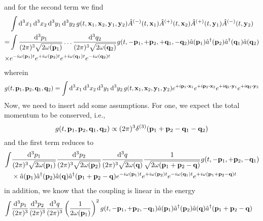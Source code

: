 and for the second term we find
\begin{equation}
	\begin{split}
		&
		\int\dd[3]{x_1}\dd[3]{x_2}\dd[3]{y_1}\dd[3]{y_2}
		g(t,\vb{x}_1,\vb{x}_2,\vb{y}_1,\vb{y}_2)
		\hat{A}^{(-)}(t,\vb{x}_1)
		\hat{A}^{(+)}(t,\vb{x}_2)
		\hat{A}^{(+)}(t,\vb{y}_1)
		\hat{A}^{(-)}(t,\vb{y}_2)
		\\
		=&
		\int
		\frac{\dd[3]{p_1}}{(2\pi)^3\sqrt{2\omega(\vb{p}_1)}}
		\dots
		\frac{\dd[3]{q_2}}{(2\pi)^3\sqrt{2\omega(\vb{q}_2)}}
		g(t,-\vb{p}_1,+\vb{p}_2,+\vb{q}_1,-\vb{q}_2)
		\hat{a}(\vb{p}_1)
		\hat{a}^\dagger(\vb{p}_2)
		\hat{a}^\dagger(\vb{q}_1)
		\hat{a}(\vb{q}_2)
		\\
		\times&
		e^{-i\omega(\vb{p}_1)t}
		e^{+i\omega(\vb{p}_2)t}
		e^{+i\omega(\vb{q}_1)t}
		e^{-i\omega(\vb{q}_2)t}
	\end{split}
\end{equation}
wherein
\begin{equation}
	g(t,\vb{p}_1,\vb{p}_2,\vb{q}_1,\vb{q}_2)
	=
	\int\dd[3]{x_1}\dd[3]{x_2}\dd[3]{y_1}\dd[3]{y_2}
	g(t,\vb{x}_1,\vb{x}_2,\vb{y}_1,\vb{y}_2)
	e^{+i\vb{p}_1\vdot\vb{x}_1}
	e^{+i\vb{p}_2\vdot\vb{x}_2}
	e^{+i\vb{q}_1\vdot\vb{y}_1}
	e^{+i\vb{q}_2\vdot\vb{y}_2}
\end{equation}
Now, we need to insert add some assumptions. For one, we expect the total momentum to be conserved, i.e.,
\begin{equation}
	g(t,\vb{p}_1,\vb{p}_2,\vb{q}_1,\vb{q}_2)
	\propto
	(2\pi)^3
	\delta^{(3)}(\vb{p}_1+\vb{p}_2-\vb{q}_1-\vb{q}_2)
\end{equation}
and the first term reduces to
\begin{equation}
	\begin{split}
		\int
		&
		\frac{\dd[3]{p_1}}{(2\pi)^3\sqrt{2\omega(\vb{p}_1)}}
		\frac{\dd[3]{p_2}}{(2\pi)^3\sqrt{2\omega(\vb{p}_2)}}
		\frac{\dd[3]{q}}{(2\pi)^3\sqrt{2\omega(\vb{q})}}
		\frac{1}{\sqrt{2\omega(\vb{p}_1+\vb{p}_2-\vb{q})}}
		g(t,-\vb{p}_1,+\vb{p}_2,-\vb{q}_1)
		\\
		&\times
		\hat{a}(\vb{p}_1)
		\hat{a}^\dagger(\vb{p}_2)
		\hat{a}(\vb{q})
		\hat{a}^\dagger(\vb{p}_1+\vb{p}_2-\vb{q})
		e^{-i\omega(\vb{p}_1)t}
		e^{+i\omega(\vb{p}_2)t}
		e^{-i\omega(\vb{q}_1)t}
		e^{+i\omega(\vb{p}_1+\vb{p}_2-\vb{q})t}
	\end{split}
\end{equation}
in addition, we know that the coupling is linear in the energy
\begin{equation}
	\begin{split}
		\int
		&
		\frac{\dd[3]{p_1}}{(2\pi)^3}
		\frac{\dd[3]{p_2}}{(2\pi)^3}
		\frac{\dd[3]{q}}{(2\pi)^3}
		\left(
			\frac{1}{2\omega(\vb{p}_1)}
		\right)^2
		g(t,-\vb{p}_1,+\vb{p}_2,-\vb{q}_1)
		\hat{a}(\vb{p}_1)
		\hat{a}^\dagger(\vb{p}_2)
		\hat{a}(\vb{q})
		\hat{a}^\dagger(\vb{p}_1+\vb{p}_2-\vb{q})
	\end{split}
\end{equation}
